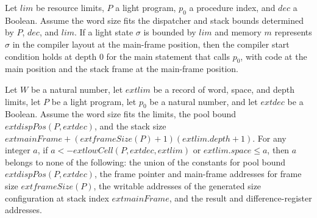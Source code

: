 \begin{theorem}
\label{Light.Compiler.start_mainStmt}
\leanok
{}
Let $lim$ be resource limits, $P$ a light program, $p_0$ a procedure index, and $dec$ a
Boolean. Assume the word size fits the dispatcher and stack bounds determined by $P$, $dec$,
and $lim$. If a light state $\sigma$ is bounded by $lim$ and memory $m$ represents $\sigma$
in the compiler layout at the main-frame position, then the compiler start condition holds
at depth $0$ for the main statement that calls $p_0$, with code at the main position and
the stack frame at the main-frame position.
\end{theorem}

\begin{theorem}
\label{Light.Compiler.not_mem_of_far}
\leanok
{}
Let $W$ be a natural number, let $	ext{lim}$ be a record of word, space, and depth
limits, let $P$ be a light program, let $p_0$ be a natural number, and let $	ext{dec}$
be a Boolean. Assume the word size fits the limits, the pool bound
$	ext{dispPos}(P,	ext{dec})$, and the stack size
$	ext{mainFrame}+(	ext{frameSize}(P)+1)(	ext{lim.depth}+1)$. For any integer $a$, if
$a<-	ext{lowCell}(P,	ext{dec},	ext{lim})$ or $	ext{lim.space}\le a$, then $a$ belongs to
none of the following: the union of the constants for pool bound
$	ext{dispPos}(P,	ext{dec})$, the frame pointer and main-frame addresses for frame size
$	ext{frameSize}(P)$, the writable addresses of the generated size configuration at
stack index $	ext{mainFrame}$, and the result and difference-register addresses.
\end{theorem}

